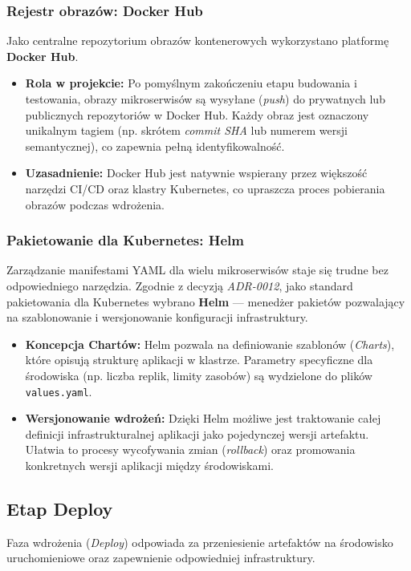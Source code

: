 \subsubsection{Rejestr obrazów: Docker Hub}
Jako centralne repozytorium obrazów kontenerowych wykorzystano platformę \textbf{Docker Hub}.
\begin{itemize}
    \item \textbf{Rola w projekcie:} Po pomyślnym zakończeniu etapu budowania i testowania, obrazy mikroserwisów są wysyłane (\textit{push}) do prywatnych lub publicznych repozytoriów w Docker Hub. Każdy obraz jest oznaczony unikalnym tagiem (np. skrótem \textit{commit SHA} lub numerem wersji semantycznej), co zapewnia pełną identyfikowalność.
    \item \textbf{Uzasadnienie:} Docker Hub jest natywnie wspierany przez większość narzędzi CI/CD oraz klastry Kubernetes, co upraszcza proces pobierania obrazów podczas wdrożenia.
\end{itemize}

\subsubsection{Pakietowanie dla Kubernetes: Helm}
Zarządzanie manifestami YAML dla wielu mikroserwisów staje się trudne bez odpowiedniego narzędzia. Zgodnie z decyzją \textit{ADR-0012}, jako standard pakietowania dla Kubernetes wybrano \textbf{Helm} — menedżer pakietów pozwalający na szablonowanie i wersjonowanie konfiguracji infrastruktury.
\begin{itemize}
    \item \textbf{Koncepcja Chartów:} Helm pozwala na definiowanie szablonów (\textit{Charts}), które opisują strukturę aplikacji w klastrze. Parametry specyficzne dla środowiska (np. liczba replik, limity zasobów) są wydzielone do plików \texttt{values.yaml}.
    \item \textbf{Wersjonowanie wdrożeń:} Dzięki Helm możliwe jest traktowanie całej definicji infrastrukturalnej aplikacji jako pojedynczej wersji artefaktu. Ułatwia to procesy wycofywania zmian (\textit{rollback}) oraz promowania konkretnych wersji aplikacji między środowiskami.
\end{itemize}

\subsection{Etap Deploy}
Faza wdrożenia (\textit{Deploy}) odpowiada za przeniesienie artefaktów na środowisko uruchomieniowe oraz zapewnienie odpowiedniej infrastruktury.

